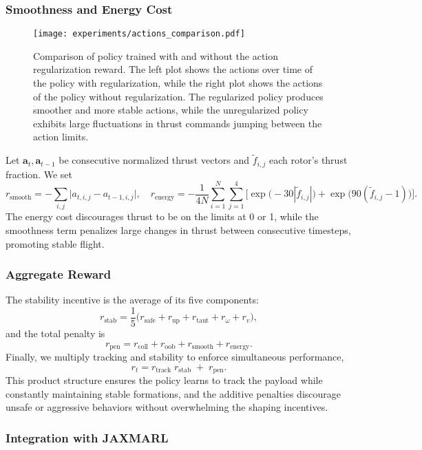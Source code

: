 \subsubsection{Smoothness and Energy Cost}
\begin{figure}[ht]
    \centering
    
    \texttt{[image: experiments/actions\_comparison.pdf]}
    \caption{Comparison of policy trained with and without the action regularization reward. The left plot shows the actions over time of the policy with regularization, while the right plot shows the actions of the policy without regularization. The regularized policy produces smoother and more stable actions, while the unregularized policy exhibits large fluctuations in thrust commands jumping between the action limits.}
    \label{fig:}
\end{figure}
Let \(\mathbf{a}_t,\mathbf{a}_{t-1}\) be consecutive normalized thrust vectors and \(\tilde f_{i,j}\) each rotor's thrust fraction.  We set
\[
r_{\mathrm{smooth}}
= -\sum_{i,j} \bigl|a_{t,i,j}-a_{t-1,i,j}\bigr|,
\quad
r_{\mathrm{energy}}
= -\frac{1}{4N}\sum_{i=1}^N\sum_{j=1}^4\bigl[\exp\bigl(-30|\tilde f_{i,j}|\bigr)+\exp\bigl(90(\tilde f_{i,j}-1)\bigr)\bigr].
\]
The energy cost discourages thrust to be on the limits at 0 or 1, while the smoothness term penalizes large changes in thrust between consecutive timesteps, promoting stable flight.
\subsubsection{Aggregate Reward}
The stability incentive is the average of its five components:
\[
r_{\mathrm{stab}}
= \frac{1}{5}\bigl(r_{\mathrm{safe}} + r_{\mathrm{up}} + r_{\mathrm{taut}} + r_{\omega} + r_{v}\bigr),
\]
and the total penalty is
\[
r_{\mathrm{pen}}
= r_{\mathrm{coll}} + r_{\mathrm{oob}} + r_{\mathrm{smooth}} + r_{\mathrm{energy}}.
\]
Finally, we multiply tracking and stability to enforce simultaneous performance,
\[
r_t
= r_{\mathrm{track}}\;r_{\mathrm{stab}}
\;+\;r_{\mathrm{pen}}.
\]
This product structure ensures the policy learns to track the payload while constantly maintaining stable formations, and the additive penalties discourage unsafe or aggressive behaviors without overwhelming the shaping incentives.

\subsubsection{Integration with JAXMARL}

